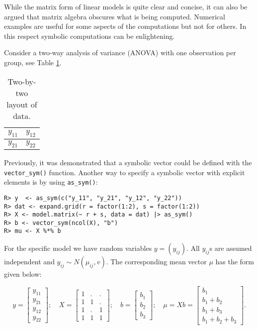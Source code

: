 While the matrix form of linear models is quite clear and concise,
it can also be argued that matrix algebra
obscures what is being computed. Numerical examples are useful for
some aspects of the computations but not for others. In this respect
symbolic computations can be enlightening.

Consider a two-way analysis of variance (ANOVA) with one observation
per group, see Table \ref{tab:anova-two-way-table}.

\begin{table}[!h]
\centering
\caption{\label{tab:anova-two-way-table}Two-by-two layout of data.}
\centering
\begin{tabular}[t]{|>{}l|>{}l|}
\hline
$y_{11}$ & $y_{12}$\\
\hline
$y_{21}$ & $y_{22}$\\
\hline
\end{tabular}
\end{table}

Previously, it was demonstrated that a symbolic
vector could be defined with the \texttt{vector\_sym()} function.
Another way to specify a symbolic vector with explicit elements is
by using \texttt{as\_sym()}:

\begin{verbatim}
R> y  <- as_sym(c("y_11", "y_21", "y_12", "y_22"))
R> dat <- expand.grid(r = factor(1:2), s = factor(1:2))
R> X <- model.matrix(~ r + s, data = dat) |> as_sym()
R> b <- vector_sym(ncol(X), "b")
R> mu <- X %*% b
\end{verbatim}

For the specific model we have random variables \(y=(y_{ij})\). All
\(y_{ij}\)s are assumed independent and \(y_{ij}\sim N(\mu_{ij}, v)\).
The corresponding mean vector \(\mu\) has the form given below:

\begin{equation}
y = \left[\begin{matrix}y_{11}\\y_{21}\\y_{12}\\y_{22}\end{matrix}\right]; \quad X=\left[\begin{matrix}1 & . & .\\1 & 1 & .\\1 & . & 1\\1 & 1 & 1\end{matrix}\right]; \quad b=\left[\begin{matrix}b_{1}\\b_{2}\\b_{3}\end{matrix}\right]; \quad  \mu = X b = \left[\begin{matrix}b_{1}\\b_{1} + b_{2}\\b_{1} + b_{3}\\b_{1} + b_{2} + b_{3}\end{matrix}\right] .
\end{equation}

